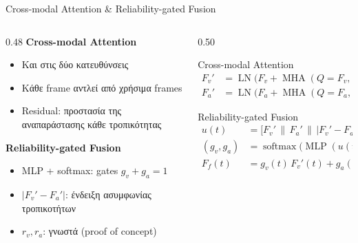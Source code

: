 \documentclass[aspectratio=169,10pt,xcolor=table]{beamer}
\begin{document}
\begin{frame}{Cross-modal Attention \& Reliability-gated Fusion}
  \begin{columns}[c]
    \begin{column}{0.48\textwidth}
      \textbf{Cross-modal Attention}
      \begin{itemize}
        \item Και στις δύο κατευθύνσεις
        \item Κάθε frame αντλεί από χρήσιμα frames
        \item Residual: προστασία της αναπαράστασης κάθε τροπικότητας
      \end{itemize}
      \textbf{Reliability-gated Fusion}
      \begin{itemize}
        \item MLP + softmax: gates $g_v + g_a = 1$
        \item $|F_v'-F_a'|$: ένδειξη ασυμφωνίας τροπικοτήτων
        \item $r_v, r_a$: γνωστά (proof of concept)
      \end{itemize}
    \end{column}
    \begin{column}{0.50\textwidth}
      \begin{block}{Cross-modal Attention}
        \vspace{-2mm}
        \begin{align*}
          F_v' &= \operatorname{LN}\!\big(F_v + \operatorname{MHA}(Q{=}F_v,\ K{=}V{=}F_a)\big)\\
          F_a' &= \operatorname{LN}\!\big(F_a + \operatorname{MHA}(Q{=}F_a,\ K{=}V{=}F_v')\big)
        \end{align*}
      \end{block}
      \begin{block}{Reliability-gated Fusion}
        \vspace{-2mm}
        \begin{align*}
          u(t) &= \big[F_v' \,\|\, F_a' \,\|\, |F_v'-F_a'| \,\|\, r_v \,\|\, r_a\big]\\
          (g_v, g_a) &= \operatorname{softmax}\big(\operatorname{MLP}(u(t))\big)\\
          F_f(t) &= g_v(t)\, F_v'(t) + g_a(t)\, F_a'(t)
        \end{align*}
      \end{block}
    \end{column}
  \end{columns}
\end{frame}
\end{document}
